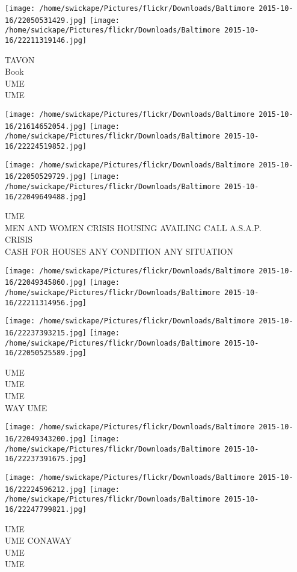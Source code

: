 \documentclass[10pt,letterpaper]{article}
\begin{document}
\texttt{[image: /home/swickape/Pictures/flickr/Downloads/Baltimore 2015-10-16/22050531429.jpg]}
\texttt{[image: /home/swickape/Pictures/flickr/Downloads/Baltimore 2015-10-16/22211319146.jpg]}

TAVON\\
Book\\
UME\\
UME
\pagebreak

\texttt{[image: /home/swickape/Pictures/flickr/Downloads/Baltimore 2015-10-16/21614652054.jpg]}
\texttt{[image: /home/swickape/Pictures/flickr/Downloads/Baltimore 2015-10-16/22224519852.jpg]}

\texttt{[image: /home/swickape/Pictures/flickr/Downloads/Baltimore 2015-10-16/22050529729.jpg]}
\texttt{[image: /home/swickape/Pictures/flickr/Downloads/Baltimore 2015-10-16/22049649488.jpg]}

UME\\
MEN AND WOMEN CRISIS HOUSING AVAILING CALL A.S.A.P.\\
CRISIS\\
CASH FOR HOUSES ANY CONDITION ANY SITUATION
\pagebreak

\texttt{[image: /home/swickape/Pictures/flickr/Downloads/Baltimore 2015-10-16/22049345860.jpg]}
\texttt{[image: /home/swickape/Pictures/flickr/Downloads/Baltimore 2015-10-16/22211314956.jpg]}

\texttt{[image: /home/swickape/Pictures/flickr/Downloads/Baltimore 2015-10-16/22237393215.jpg]}
\texttt{[image: /home/swickape/Pictures/flickr/Downloads/Baltimore 2015-10-16/22050525589.jpg]}

UME\\
UME\\
UME\\
WAY UME
\pagebreak

\texttt{[image: /home/swickape/Pictures/flickr/Downloads/Baltimore 2015-10-16/22049343200.jpg]}
\texttt{[image: /home/swickape/Pictures/flickr/Downloads/Baltimore 2015-10-16/22237391675.jpg]}

\texttt{[image: /home/swickape/Pictures/flickr/Downloads/Baltimore 2015-10-16/22224596212.jpg]}
\texttt{[image: /home/swickape/Pictures/flickr/Downloads/Baltimore 2015-10-16/22247799821.jpg]}

UME\\
UME CONAWAY\\
UME\\
UME
\pagebreak
\end{document}
